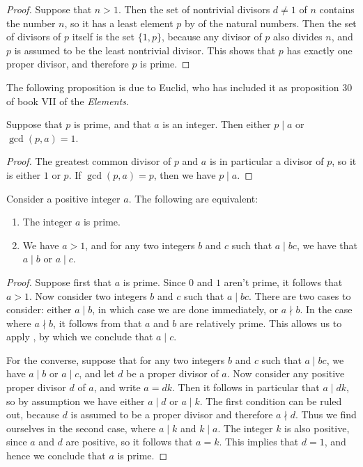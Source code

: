 \begin{proof}
  Suppose that $n>1$. Then the set of nontrivial divisors $d\neq 1$ of $n$ contains the number $n$, so it has a least element $p$ by  of the natural numbers. Then the set of divisors of $p$ itself is the set $\{1,p\}$, because any divisor of $p$ also divides $n$, and $p$ is assumed to be the least nontrivial divisor. This shows that $p$ has exactly one proper divisor, and therefore $p$ is prime.
\end{proof}

The following proposition is due to Euclid, who has included it as proposition 30 of book VII of the \emph{Elements}.

\begin{lemma}\label{lemma:cases-prime-divisibility}
  Suppose that $p$ is prime, and that $a$ is an integer. Then either $p\mid a$ or $\gcd(p,a)=1$.
\end{lemma}

\begin{proof}
  The greatest common divisor of $p$ and $a$ is in particular a divisor of $p$, so it is either $1$ or $p$. If $\gcd(p,a)=p$, then we have $p\mid a$.
\end{proof}

\begin{proposition}\label{proposition:euclid-divisibility-primes}
  Consider a positive integer $a$. The following are equivalent:
  \begin{enumerate}
  \item The integer $a$ is prime.
  \item We have $a>1$, and for any two integers $b$ and $c$ such that $a\mid bc$, we have that $a\mid b$ or $a\mid c$.
  \end{enumerate}
\end{proposition}

\begin{proof}
  Suppose first that $a$ is prime. Since $0$ and $1$ aren't prime, it follows that $a>1$. Now consider two integers $b$ and $c$ such that $a\mid bc$. There are two cases to consider: either $a\mid b$, in which case we are done immediately, or $a\nmid b$. In the case where $a\nmid b$, it follows from  that $a$ and $b$ are relatively prime. This allows us to apply , by which we conclude that $a\mid c$.

  For the converse, suppose that for any two integers $b$ and $c$ such that $a\mid bc$, we have $a\mid b$ or $a\mid c$, and let $d$ be a proper divisor of $a$. Now consider any positive proper divisor $d$ of $a$, and write $a=dk$. Then it follows in particular that $a \mid dk$, so by assumption we have either $a\mid d$ or $a\mid k$. The first condition can be ruled out, because $d$ is assumed to be a proper divisor and therefore $a \nmid d$. Thus we find ourselves in the second case, where $a\mid k$ and $k\mid a$. The integer $k$ is also positive, since $a$ and $d$ are positive, so it follows that $a=k$. This implies that $d=1$, and hence we conclude that $a$ is prime.
\end{proof}


